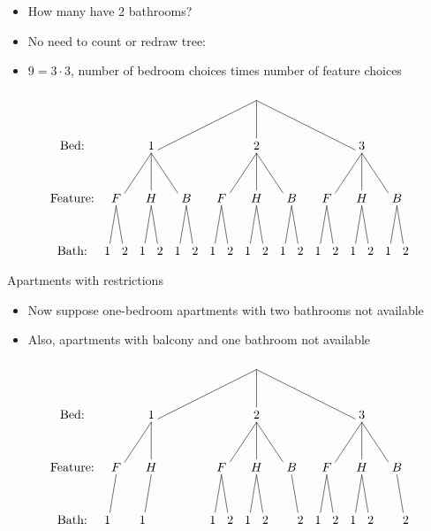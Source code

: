 \documentclass[handout]{beamer}
\theoremstyle{definition}
\begin{document}
\begin{frame}
\begin{itemize}
\item How many have 2 bathrooms?
\item No need to count or redraw tree:
\item$ 9=3\cdot 3$, number of bedroom choices times
number of feature choices
\end{itemize}
\[\begin{xy}<.5cm,0cm>:
(8.5,0)="0";
(2.5,-3)="1";
(8.5,-3)="2";
(14.5,-3)="3";
"0";"1"*+!D{1}**\dir{-};
"0";"2"*+!D{2}**\dir{-};
"0";"3"*+!D{3}**\dir{-};
(.5,-6)="11";
(2.5,-6)="12";
(4.5,-6)="13";
(6.5,-6)="21";
(8.5,-6)="22";
(10.5,-6)="23";
(12.5,-6)="31";
(14.5,-6)="32";
(16.5,-6)="33";
"1";"11"*+!D{F}**\dir{-};
"1";"12"*+!D{H}**\dir{-};
"1";"13"*+!D{B}**\dir{-};
"2";"21"*+!D{F}**\dir{-};
"2";"22"*+!D{H}**\dir{-};
"2";"23"*+!D{B}**\dir{-};
"3";"31"*+!D{F}**\dir{-};
"3";"32"*+!D{H}**\dir{-};
"3";"33"*+!D{B}**\dir{-};
"11";(0,-9)*+!D{1}**\dir{-};
"11";(1,-9)*+!D{2}**\dir{-};
"12";(2,-9)*+!D{1}**\dir{-};
"12";(3,-9)*+!D{2}**\dir{-};
"13";(4,-9)*+!D{1}**\dir{-};
"13";(5,-9)*+!D{2}**\dir{-};
"21";(6,-9)*+!D{1}**\dir{-};
"21";(7,-9)*+!D{2}**\dir{-};
"22";(8,-9)*+!D{1}**\dir{-};
"22";(9,-9)*+!D{2}**\dir{-};
"23";(10,-9)*+!D{1}**\dir{-};
"23";(11,-9)*+!D{2}**\dir{-};
"31";(12,-9)*+!D{1}**\dir{-};
"31";(13,-9)*+!D{2}**\dir{-};
"32";(14,-9)*+!D{1}**\dir{-};
"32";(15,-9)*+!D{2}**\dir{-};
"33";(16,-9)*+!D{1}**\dir{-};
"33";(17,-9)*+!D{2}**\dir{-};
(-2,-3)*+!D{\text{Bed:}};
(-2,-6)*+!D{\text{Feature:}};
(-2,-9)*+!D{\text{Bath:}};
\end{xy}\]
\end{frame}

\begin{frame}{Apartments with restrictions}
\begin{itemize}
\item Now suppose one-bedroom apartments with
two bathrooms not available
\item Also, apartments with balcony and one
bathroom not available
\end{itemize}
\[\begin{xy}<.5cm,0cm>:
(8.5,0)="0";
(2.5,-3)="1";
(8.5,-3)="2";
(14.5,-3)="3";
"0";"1"*+!D{1}**\dir{-};
"0";"2"*+!D{2}**\dir{-};
"0";"3"*+!D{3}**\dir{-};
(.5,-6)="11";
(2.5,-6)="12";
(4.5,-6)="13";
(6.5,-6)="21";
(8.5,-6)="22";
(10.5,-6)="23";
(12.5,-6)="31";
(14.5,-6)="32";
(16.5,-6)="33";
"1";"11"*+!D{F}**\dir{-};
"1";"12"*+!D{H}**\dir{-};
"2";"21"*+!D{F}**\dir{-};
"2";"22"*+!D{H}**\dir{-};
"2";"23"*+!D{B}**\dir{-};
"3";"31"*+!D{F}**\dir{-};
"3";"32"*+!D{H}**\dir{-};
"3";"33"*+!D{B}**\dir{-};
"11";(0,-9)*+!D{1}**\dir{-};
"12";(2,-9)*+!D{1}**\dir{-};
"21";(6,-9)*+!D{1}**\dir{-};
"21";(7,-9)*+!D{2}**\dir{-};
"22";(8,-9)*+!D{1}**\dir{-};
"22";(9,-9)*+!D{2}**\dir{-};
"23";(11,-9)*+!D{2}**\dir{-};
"31";(12,-9)*+!D{1}**\dir{-};
"31";(13,-9)*+!D{2}**\dir{-};
"32";(14,-9)*+!D{1}**\dir{-};
"32";(15,-9)*+!D{2}**\dir{-};
"33";(17,-9)*+!D{2}**\dir{-};
(-2,-3)*+!D{\text{Bed:}};
(-2,-6)*+!D{\text{Feature:}};
(-2,-9)*+!D{\text{Bath:}};
\end{xy}\]
\end{frame}
\end{document}
